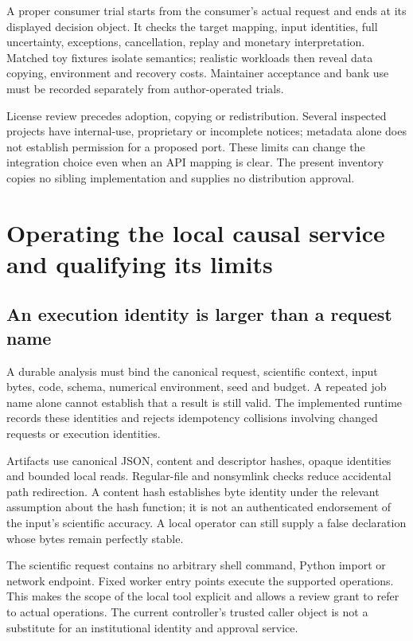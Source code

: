 A proper consumer trial starts from the consumer's actual request and ends at
its displayed decision object. It checks the target mapping, input identities,
full uncertainty, exceptions, cancellation, replay and monetary interpretation.
Matched toy fixtures isolate semantics; realistic workloads then reveal data
copying, environment and recovery costs. Maintainer acceptance and bank use
must be recorded separately from author-operated trials.

License review precedes adoption, copying or redistribution. Several inspected
projects have internal-use, proprietary or incomplete notices; metadata alone
does not establish permission for a proposed port.\cite{v12_in_inventory} These
limits can change the integration choice even when an API mapping is clear.
The present inventory copies no sibling implementation and supplies no
distribution approval.

\chapter{Operating the local causal service and qualifying its limits}
\label{in:operations}

\section{An execution identity is larger than a request name}

A durable analysis must bind the canonical request, scientific context, input
bytes, code, schema, numerical environment, seed and budget. A repeated job
name alone cannot establish that a result is still valid. The implemented
runtime records these identities and rejects idempotency collisions involving
changed requests or execution identities.\cite{v12_in_runtime}

Artifacts use canonical JSON, content and descriptor hashes, opaque identities
and bounded local reads. Regular-file and nonsymlink checks reduce accidental
path redirection. A content hash establishes byte identity under the relevant
assumption about the hash function; it is not an authenticated endorsement of
the input's scientific accuracy. A local operator can still supply a false
declaration whose bytes remain perfectly stable.

The scientific request contains no arbitrary shell command, Python import or
network endpoint. Fixed worker entry points execute the supported operations.
This makes the scope of the local tool explicit and allows a review grant to
refer to actual operations. The current controller's trusted caller object is
not a substitute for an institutional identity and approval service.

